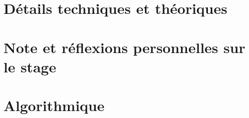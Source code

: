 \chapter{Détails techniques et théoriques}




\chapter{Note et réflexions personnelles sur le stage}



\chapter{Algorithmique}



